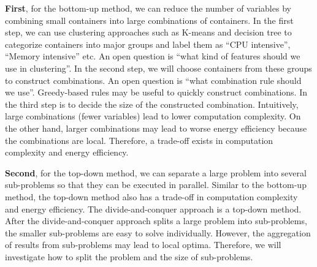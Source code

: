 \begin{enumerate}
	 \textbf{First}, for the bottom-up method, we can reduce the number of variables by combining small containers
	into large combinations of containers. In the first step, we can use clustering approaches such as K-means \cite{Xie:2011fj} and decision tree to categorize containers into major groups and label them as ``CPU intensive'', ``Memory intensive'' etc. An open question is ``what kind of features should we use in clustering''.  In the second step, we will choose containers from these groups to construct combinations. An open question is ``what combination rule should we use''. Greedy-based rules may be useful to quickly construct combinations. In the third step is to decide the size of the constructed combination. Intuitively, large combinations (fewer variables) lead to lower computation complexity. On the other hand, larger combinations may lead to worse energy efficiency because the combinations are local. Therefore, a trade-off exists in computation complexity and energy efficiency. 

	\textbf{Second}, for the top-down method, we can separate a large problem into several sub-problems so that they can be executed in parallel. Similar to the bottom-up method, the top-down method also has a trade-off in computation complexity and energy efficiency. The divide-and-conquer approach is a top-down method.  After the divide-and-conquer approach splits a large problem into sub-problems, the smaller sub-problems are easy to solve individually. However, the aggregation of results from sub-problems may lead to local optima.  Therefore, we will investigate how to split the problem and the size of sub-problems. 





\end{enumerate}
